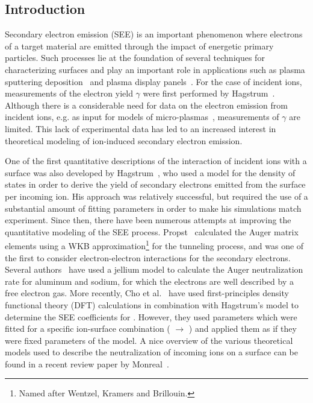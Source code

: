 \begin{refsection}
\newpage 
 
\section{Introduction} \label{quotas:sec-intro} 

Secondary electron emission (SEE) is an important phenomenon where electrons 
of a target material are emitted through the impact of energetic primary 
particles. Such processes lie at the foundation of several techniques for 
characterizing surfaces and play an important role in applications such as 
plasma sputtering deposition~\cite{Depla2006, Depla2009} and plasma display 
panels~\cite{Motoyama2006, Cho2007}. For the case of incident ions, 
measurements of the electron yield $\gamma$ were first performed by 
Hagstrum~\cite{Hagstrum1953,Hagstrum1960}. Although there is a considerable 
need for data on the electron emission from incident ions, e.g. as input for 
models of micro-plasmas~\cite{Kothnur2003, Kothnur2005}, measurements of 
$\gamma$ are limited. This lack of experimental data has led to an increased 
interest in theoretical modeling of ion-induced secondary electron emission. 
 
One of the first quantitative descriptions of the interaction of incident ions 
with a surface was also developed by Hagstrum~\cite{Hagstrum1954, 
Hagstrum1961}, who used a model for the density of states in order to derive 
the yield of secondary electrons emitted from the surface per incoming ion. 
His approach was relatively successful, but required the use of a substantial 
amount of fitting parameters in order to make his simulations match 
experiment. Since then, there have been numerous attempts at improving the 
quantitative modeling of the SEE process. Propst~\cite{Propst1963} calculated 
the Auger matrix elements using a WKB approximation\footnote{Named after Wentzel, Kramers and Brillouin.} for the tunneling process, 
and was one of the first to consider electron-electron interactions for the 
secondary electrons. Several authors~\cite{Almulhem1989, Lorente1994, 
Monreal1995} have used a jellium model to calculate the Auger neutralization 
rate for aluminum and sodium, for which the electrons are well described by a 
free electron gas. More recently, Cho et al.~\cite{Cho2007} have used 
first-principles density functional theory (DFT) calculations in combination 
with Hagstrum's model to determine the SEE coefficients for . However, 
they used parameters which were fitted for a specific ion-surface combination 
( $\rightarrow$ ) and applied them as if they were fixed 
parameters of the model. A nice overview of the various theoretical models 
used to describe the neutralization of incoming ions on a surface can be found 
in a recent review paper by Monreal~\cite{Monreal2014}.
 

\end{refsection}
